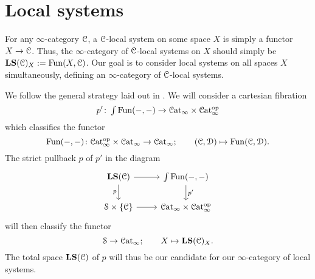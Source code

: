 \documentclass[main.tex]{subfiles}
\begin{document}
\section{Local systems}
\label{sec:local_systems}

For any $\infty$-category $\mathcal{C}$, a $\mathcal{C}$-local system on some space $X$ is simply a functor $X \to \mathcal{C}$. Thus, the $\infty$-category of $\mathcal{C}$-local systems on $X$ should simply be $\mathbf{LS}(\mathcal{C})_{X}:=\mathrm{Fun}(X, \mathcal{C})$. Our goal is to consider local systems on all spaces $X$ simultaneously, defining an $\infty$-category of $\mathcal{C}$-local systems.

We follow the general strategy laid out in \cite{luriehopkins2013ambidexterity}. We will consider a cartesian fibration 
\begin{equation*}
  p'\colon\smallint\Fun(-, -) \to \ICat \times \ICat\op
\end{equation*}
which classifies the functor
\begin{equation*}
  \mathrm{Fun}(-,-)\colon \mathcal{C}\mathrm{at}_{\infty}^{\mathrm{op}} \times \mathcal{C}\mathrm{at}_{\infty} \to \mathcal{C}\mathrm{at}_{\infty};\qquad (\mathcal{C}, \mathcal{D}) \mapsto \mathrm{Fun}(\mathcal{C}, \mathcal{D}).
\end{equation*}
The strict pullback $p$ of $p'$ in the diagram
\begin{equation*}
  \begin{tikzcd}
    \LS(\category{C})
    \arrow[r]
    \arrow[d, swap, "p"]
    & \int\Fun(-, -)
    \arrow[d, "p'"]
    \\
    \S \times \{\category{C}\}
    \arrow[r]
    & \ICat \times \ICat\op
  \end{tikzcd}
\end{equation*}
will then classify the functor
\begin{equation*}
  \mathcal{S} \to \mathcal{C}\mathrm{at}_{\infty};\qquad X \mapsto \mathbf{LS}(\mathcal{C})_{X}.
\end{equation*}
The total space $\mathbf{LS}(\mathcal{C})$ of $p$ will thus be our candidate for our $\infty$-category of local systems.
\end{document}
